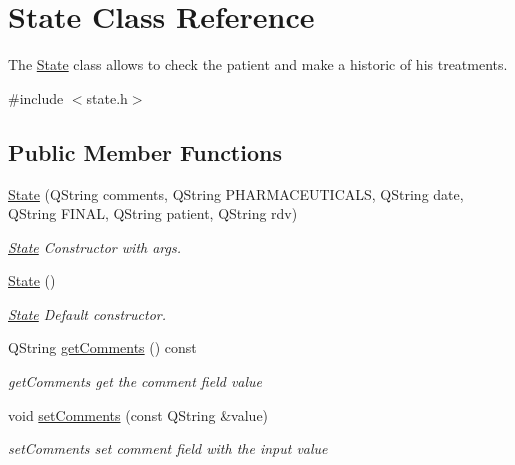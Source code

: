 \hypertarget{class_state}{}\section{State Class Reference}
\label{class_state}


The \mbox{\hyperlink{class_state}{State}} class allows to check the patient and make a historic of his treatments.  




{\ttfamily \#include $<$state.\+h$>$}

\subsection*{Public Member Functions}
\begin{DoxyCompactItemize}
\item 
\mbox{\hyperlink{class_state_a8ded2cb128d0c4d3dde1fedb066e964a}{State}} (Q\+String comments, Q\+String P\+H\+A\+R\+M\+A\+C\+E\+U\+T\+I\+C\+A\+LS, Q\+String date, Q\+String F\+I\+N\+AL, Q\+String patient, Q\+String rdv)
\begin{DoxyCompactList}\small\item\em \mbox{\hyperlink{class_state}{State}} Constructor with args. \end{DoxyCompactList}\item 
\mbox{\label{class_state_ab91bb1dd5aa6260ab2a456581daf9ec2}} 
\mbox{\hyperlink{class_state_ab91bb1dd5aa6260ab2a456581daf9ec2}{State}} ()
\begin{DoxyCompactList}\small\item\em \mbox{\hyperlink{class_state}{State}} Default constructor. \end{DoxyCompactList}\item 
Q\+String \mbox{\hyperlink{class_state_ad92b83c6f4907e456cdfc5b51fa8fdd1}{get\+Comments}} () const
\begin{DoxyCompactList}\small\item\em get\+Comments get the comment field value \end{DoxyCompactList}\item 
void \mbox{\hyperlink{class_state_ac23a5b33d51e2e2798ab5ec94f54d379}{set\+Comments}} (const Q\+String \&value)
\begin{DoxyCompactList}\small\item\em set\+Comments set comment field with the input value \end{DoxyCompactList}\item 

\end{DoxyCompactItemize}
